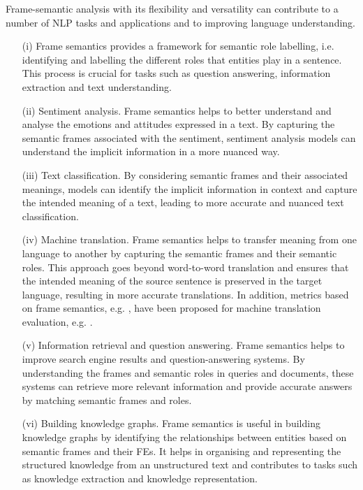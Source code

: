 \documentclass[output=paper,colorlinks,citecolor=brown]{langscibook}
\begin{document}
Frame-semantic analysis with its flexibility and versatility can contribute to a number of NLP tasks and applications and to improving language understanding.
\largerpage[2]
 
\begin{itemize}
\item[(i)] Frame semantics provides a framework for semantic role labelling, i.e. identifying and labelling the different roles that entities play in a sentence. This process is crucial for tasks such as question answering, information extraction and text understanding.

\item[(ii)] Sentiment analysis. Frame semantics helps to better understand and analyse the emotions and attitudes expressed in a text. By capturing the semantic frames associated with the sentiment, sentiment analysis models can understand the implicit information in a more nuanced way.

\item[(iii)] Text classification. By considering semantic frames and their associated meanings, models can identify the implicit information in context and capture the intended meaning of a text, leading to more accurate and nuanced text classification.

\item[(iv)] Machine translation. Frame semantics helps to transfer meaning from one language to another by capturing the semantic frames and their semantic roles. This approach goes beyond word-to-word translation and ensures that the intended meaning of the source sentence is preserved in the target language, resulting in more accurate translations. In addition, metrics based on frame semantics, e.g. \citep{czulo2019designing}, have been proposed for machine translation evaluation, e.g. \citep{czulo2019designing}.

\item[(v)] Information retrieval and question answering. Frame semantics helps to improve search engine results and question-answering systems. By understanding the frames and semantic roles in queries and documents, these systems can retrieve more relevant information and provide accurate answers by matching semantic frames and roles.

\item[(vi)] Building knowledge graphs. Frame semantics is useful in building knowledge graphs by identifying the relationships between entities based on semantic frames and their FEs. It helps in organising and representing the structured knowledge from an unstructured text and contributes to tasks such as knowledge extraction and knowledge representation.
 \end{itemize}
\end{document}
